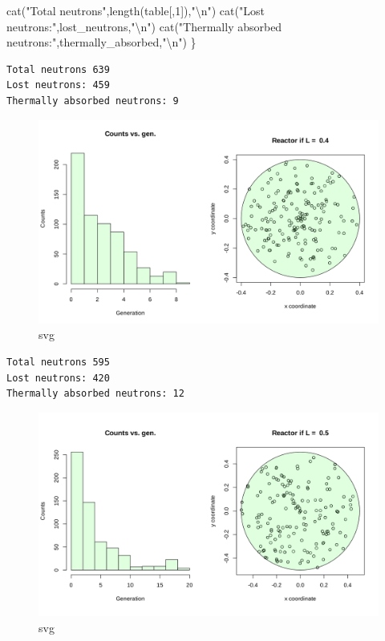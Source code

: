 \documentclass[11pt]{article}
\newenvironment{Shaded}{}{}
\newcommand{\DecValTok}[1]{\textcolor[rgb]{0.25,0.63,0.44}{{#1}}}
\newcommand{\StringTok}[1]{\textcolor[rgb]{0.25,0.44,0.63}{{#1}}}
\newcommand{\FunctionTok}[1]{\textcolor[rgb]{0.02,0.16,0.49}{{#1}}}
\newcommand{\NormalTok}[1]{{#1}}
\newcommand{\SpecialCharTok}[1]{\textcolor[rgb]{0.25,0.44,0.63}{{#1}}}
\begin{document}
\begin{Shaded}
\begin{Highlighting}[]
        \FunctionTok{cat}\NormalTok{(}\StringTok{"Total neutrons"}\NormalTok{,}\FunctionTok{length}\NormalTok{(table[,}\DecValTok{1}\NormalTok{]),}\StringTok{"}\SpecialCharTok{\textbackslash{}n}\StringTok{"}\NormalTok{)}
        \FunctionTok{cat}\NormalTok{(}\StringTok{"Lost neutrons:"}\NormalTok{,lost\_neutrons,}\StringTok{"}\SpecialCharTok{\textbackslash{}n}\StringTok{"}\NormalTok{)}
        \FunctionTok{cat}\NormalTok{(}\StringTok{"Thermally absorbed neutrons:"}\NormalTok{,thermally\_absorbed,}\StringTok{"}\SpecialCharTok{\textbackslash{}n}\StringTok{"}\NormalTok{)           }
\NormalTok{\}}
\end{Highlighting}
\end{Shaded}

\begin{verbatim}
Total neutrons 639 
Lost neutrons: 459 
Thermally absorbed neutrons: 9 
\end{verbatim}

\begin{figure}
\centering
\includegraphics{output_7_1.svg}
\caption{svg}
\end{figure}

\begin{verbatim}
Total neutrons 595 
Lost neutrons: 420 
Thermally absorbed neutrons: 12 
\end{verbatim}

\begin{figure}
\centering
\includegraphics{output_7_3.svg}
\caption{svg}
\end{figure}
\end{document}
